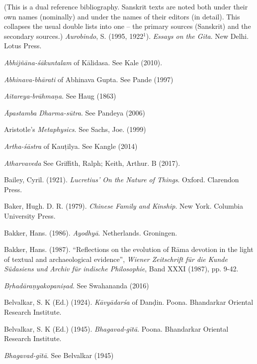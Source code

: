 \begin{thebibliography}{99}
(This is a dual reference bibliography. Sanskrit texts are noted both under their own names (nominally) and under the names of their editors (in detail). This collapses the usual double lists into one – the primary sources (Sanskrit) and the secondary sources.)
\itemsep=2pt
{\sl Aurobindo}, S. (1995, 1922$^{1}$). {\sl Essays on the Gita}. New Delhi. Lotus Press. 

{\sl Abhijñāna-śākuntalam} of Kālidasa. See Kale (2010). 

{\sl Abhinava-bhārati} of Abhinava Gupta. See Pande (1997)

{\sl Aitareya-brāhmaṇa}. See Haug (1863)

{\sl Āpastamba Dharma-sūtra}. See Pandeya (2006)

Aristotle’s {\sl Metaphysics}. See Sachs, Joe. (1999)

{\sl Artha-śāstra} of Kauṭilya. See Kangle (2014)  

{\sl Atharvaveda} See Griffith, Ralph; Keith, Arthur. B (2017).

Bailey, Cyril. (1921). {\sl Lucretius’ On the Nature of Things}. Oxford. Clarendon Press. 

Baker, Hugh. D. R. (1979). {\sl Chinese Family and Kinship}. New York. Columbia University Press. 

Bakker, Hans. (1986). {\sl Ayodhyā}. Netherlands. Groningen. 

Bakker, Hans. (1987). “Reflections on the evolution of Rāma devotion in the light of textual and archaeological evidence”, {\sl Wiener Zeitschrift für die Kunde Südasiens und Archiv für indische Philosophie}, Band XXXI (1987), pp. 9-42. 

{\sl Bṛhadāraṇyakopaniṣad}. See Swahananda (2016)

Belvalkar, S. K (Ed.) (1924). {\sl Kāvyādarśa} of Danḍin.  Poona. Bhandarkar Oriental Research Institute. 

Belvalkar, S. K (Ed.) (1945). {\sl Bhagavad-gītā}. Poona. Bhandarkar Oriental Research Institute. 

{\sl Bhagavad-gītā}. See Belvalkar (1945)


\end{thebibliography}
